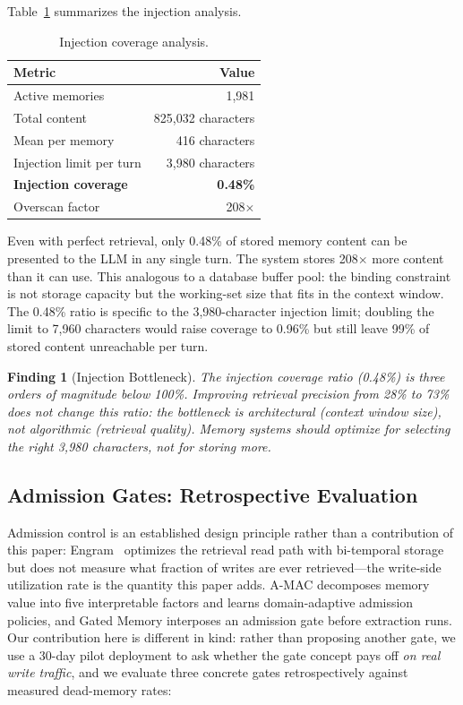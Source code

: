 \documentclass{llncs}
\newtheorem{finding}{Finding}
\begin{document}
Table~\ref{tab:injection} summarizes the injection analysis.

\begin{table}[h]
\centering
\caption{Injection coverage analysis.}
\label{tab:injection}
\begin{tabular}{lr}
\toprule
Metric & Value \\
\midrule
Active memories & 1,981 \\
Total content & 825,032 characters \\
Mean per memory & 416 characters \\
Injection limit per turn & 3,980 characters \\
\textbf{Injection coverage} & \textbf{0.48\%} \\
Overscan factor & 208$\times$ \\
\bottomrule
\end{tabular}
\end{table}

Even with perfect retrieval, only 0.48\% of stored memory content can be presented to the LLM in any single turn. The system stores 208$\times$ more content than it can use. This analogous to a database buffer pool: the binding constraint is not storage capacity but the working-set size that fits in the context window. The 0.48\% ratio is specific to the 3,980-character injection limit; doubling the limit to 7,960 characters would raise coverage to 0.96\% but still leave 99\% of stored content unreachable per turn.

\begin{finding}[Injection Bottleneck]
The injection coverage ratio (0.48\%) is three orders of magnitude below 100\%. Improving retrieval precision from 28\% to 73\% does not change this ratio: the bottleneck is architectural (context window size), not algorithmic (retrieval quality). Memory systems should optimize for \emph{selecting the right 3,980 characters}, not for storing more.
\end{finding}

\subsection{Admission Gates: Retrospective Evaluation}

Admission control is an established design principle rather than a contribution of this
paper: Engram~\cite{engram} optimizes the retrieval read path with bi-temporal storage but does not
measure what fraction of writes are ever retrieved---the write-side utilization rate is the
quantity this paper adds. A-MAC decomposes memory value into five interpretable factors and learns
domain-adaptive admission policies, and Gated Memory interposes an admission
gate before extraction runs. Our contribution here is different in kind: rather than proposing
another gate, we use a 30-day pilot deployment to ask whether the gate concept pays off
\emph{on real write traffic}, and we evaluate three concrete gates retrospectively against
measured dead-memory rates:
\end{document}

